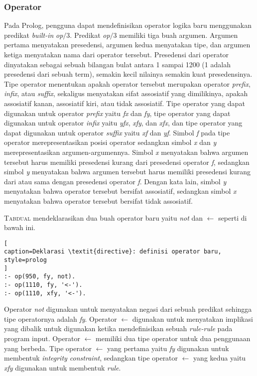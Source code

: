 \subsubsection{Operator}

Pada Prolog, pengguna dapat mendefinisikan operator logika baru menggunakan predikat \textit{built-in} \textit{op$/$}3. Predikat \textit{op$/$}3 memiliki tiga buah argumen. Argumen pertama menyatakan presedensi, argumen kedua menyatakan tipe, dan argumen ketiga menyatakan nama dari operator tersebut. Presedensi dari operator dinyatakan sebagai sebuah bilangan bulat antara 1 sampai 1200 (1 adalah presedensi dari sebuah term), semakin kecil nilainya semakin kuat presedensinya. Tipe operator menentukan apakah operator tersebut merupakan operator \textit{prefix}, \textit{infix}, atau \textit{suffix}, sekaligus menyatakan sifat assosiatif yang dimilikinya, apakah assosiatif kanan, assosiatif kiri, atau tidak assosiatif. Tipe operator yang dapat digunakan untuk operator \textit{prefix} yaitu \textit{fx} dan \textit{fy}, tipe operator yang dapat digunakan untuk operator \textit{infix} yaitu \textit{yfx}, \textit{xfy}, dan \textit{xfx}, dan tipe operator yang dapat digunakan untuk operator \textit{suffix} yaitu \textit{xf} dan \textit{yf}. Simbol \textit{f} pada tipe operator merepresentasikan posisi operator sedangkan simbol \textit{x} dan \textit{y} merepresentasikan argumen-argumennya. Simbol \textit{x} menyatakan bahwa argumen tersebut harus memiliki presedensi kurang dari presedensi operator \textit{f}, sedangkan simbol \textit{y} menyatakan bahwa argumen tersebut harus memiliki presedensi kurang dari atau sama dengan presedensi operator \textit{f}. Dengan kata lain, simbol \textit{y} menyatakan bahwa operator tersebut bersifat assosiatif, sedangkan simbol \textit{x} menyatakan bahwa operator tersebut bersifat tidak assosiatif. 

\textsc{Tabdual} mendeklarasikan dua buah operator baru yaitu \textit{not} dan $\leftarrow$ seperti di bawah ini.
\\

\begin{lstlisting}[
caption=Deklarasi \textit{directive}: definisi operator baru,
style=prolog
]
:- op(950, fy, not).
:- op(1110, fy, '<-').
:- op(1110, xfy, '<-').
\end{lstlisting}

Operator \textit{not} digunakan untuk menyatakan negasi dari sebuah predikat sehingga tipe operatornya adalah \textit{fy}. Operator $\leftarrow$ digunakan untuk menyatakan implikasi yang dibalik untuk digunakan ketika mendefinisikan sebuah \textit{rule-rule} pada program input. Operator $\leftarrow$ memiliki dua tipe operator untuk dua penggunaan yang berbeda. Tipe operator $\leftarrow$ yang pertama yaitu \textit{fy} digunakan untuk membentuk \textit{integrity constraint}, sedangkan tipe operator $\leftarrow$ yang kedua yaitu \textit{xfy} digunakan untuk membentuk \textit{rule}.

